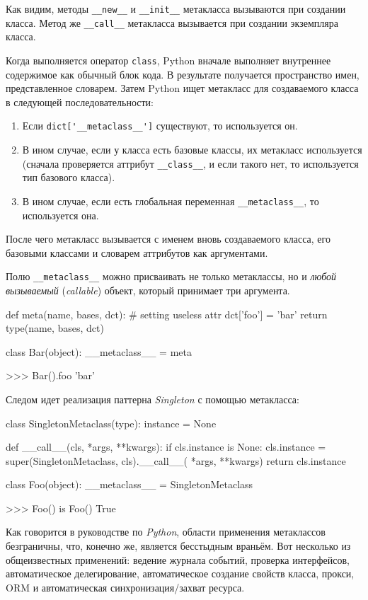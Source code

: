 Как видим, методы \lstinline{__new__} и \lstinline{__init__} метакласса вызываются при создании класса. Метод же \lstinline{__call__} метакласса вызывается при создании экземпляра класса.

Когда выполняется оператор \lstinline{class}, Python вначале выполняет внутреннее содержимое как обычный блок кода. В результате получается пространство имен, представленное словарем. Затем Python ищет метакласс для создаваемого класса в следующей последовательности:
\begin{enumerate}
  \item Если \lstinline{dict['__metaclass__']} существуют, то используется он.
  \item В ином случае, если у класса есть базовые классы, их метакласс используется (сначала проверяется аттрибут \lstinline{__class__}, и если такого нет, то используется тип базового класса).
  \item В ином случае, если есть глобальная переменная \lstinline{__metaclass__}, то используется она.
\end{enumerate}

После чего метакласс вызывается с именем вновь создаваемого класса, его базовыми классами и словарем аттрибутов как аргументами.

Полю \lstinline{__metaclass__} можно присваивать не только метаклассы, но и \emph{любой вызываемый} (\emph{callable}) объект, который принимает три аргумента.
\begin{pylst}{}{}
def meta(name, bases, dct):
    # setting useless attr
    dct['foo'] = 'bar'
    return type(name, bases, dct)

class Bar(object):
    __metaclass__ = meta

>>> Bar().foo
'bar'
\end{pylst}

Следом идет реализация паттерна \emph{Singleton} с помощью метакласса:
\begin{pylst}{}{}
class SingletonMetaclass(type):
    instance = None

    def __call__(cls, *args, **kwargs):
        if cls.instance is None:
            cls.instance = super(SingletonMetaclass, cls).__call__(
                *args, **kwargs)
        return cls.instance

class Foo(object):
     __metaclass__ = SingletonMetaclass

>>> Foo() is Foo()
True
\end{pylst}

Как говорится в руководстве по \emph{Python}, области применения метаклассов безграничны, что, конечно же, является бесстыдным враньём. Вот несколько из общеизвестных применений: ведение журнала событий, проверка интерфейсов, автоматическое делегирование, автоматическое создание свойств класса, прокси, ORM и автоматическая синхронизация/захват ресурса.

